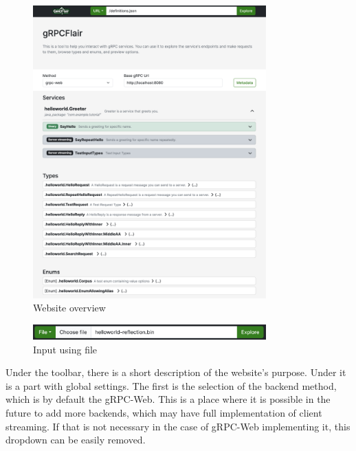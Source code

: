 \begin{figure}[!htb]
    \centering
    \captionsetup{justification=centering}
    \includegraphics[width=0.8\textwidth]{images/implementation/screenshots/fullpage}
    \caption{Website overview}
    \label{fig:implementation-screenshots-fullpage}
\end{figure}

\begin{figure}[!htb]
    \centering
    \captionsetup{justification=centering}
    \includegraphics[width=0.8\textwidth]{images/implementation/screenshots/reflection-input}
    \caption{Input using file}
    \label{fig:implementation-screenshots-reflection-input}
\end{figure}

Under the toolbar, there is a short description of the website's purpose.
Under it is a part with global settings.
The first is the selection of the backend method, which is by default the gRPC-Web.
This is a place where it is possible in the future to add more backends, which may have full implementation of client streaming.
If that is not necessary in the case of gRPC-Web implementing it, this dropdown can be easily removed.

